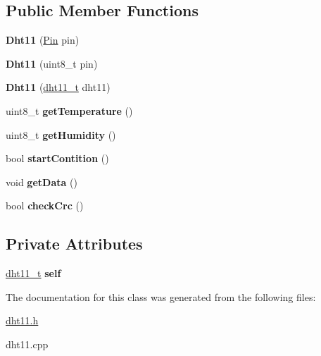 \subsection*{Public Member Functions}
\begin{DoxyCompactItemize}
\item 
\mbox{\label{classDht11_a2d28c64f9f68880b48c787fe8be65e82}} 
{\bfseries Dht11} (\hyperlink{classPin}{Pin} pin)
\item 
\mbox{\label{classDht11_aca67610ae8e6e7a2f1df449295944b12}} 
{\bfseries Dht11} (uint8\+\_\+t pin)
\item 
\mbox{\label{classDht11_af3721521ff45bfbbe0a6b2ff3801d511}} 
{\bfseries Dht11} (\hyperlink{structdht11__t}{dht11\+\_\+t} dht11)
\item 
\mbox{\label{classDht11_a0959ad424980bf0386e132b66cbade5c}} 
uint8\+\_\+t {\bfseries get\+Temperature} ()
\item 
\mbox{\label{classDht11_a7edaa36ffa969932f7522a92d4ebbc21}} 
uint8\+\_\+t {\bfseries get\+Humidity} ()
\item 
\mbox{\label{classDht11_a2e70616b1c70d2dc6937e38c6cef27de}} 
bool {\bfseries start\+Contition} ()
\item 
\mbox{\label{classDht11_ad4cb519c841e97b5d1464e1fb66b332f}} 
void {\bfseries get\+Data} ()
\item 
\mbox{\label{classDht11_aded72886f2b8eed116d027ac47227046}} 
bool {\bfseries check\+Crc} ()
\end{DoxyCompactItemize}
\subsection*{Private Attributes}
\begin{DoxyCompactItemize}
\item 
\mbox{\label{classDht11_ad12915cbf961e219ef06dc617389ca51}} 
\hyperlink{structdht11__t}{dht11\+\_\+t} {\bfseries self}
\end{DoxyCompactItemize}


The documentation for this class was generated from the following files\+:\begin{DoxyCompactItemize}
\item 
\hyperlink{dht11_8h}{dht11.\+h}\item 
dht11.\+cpp\end{DoxyCompactItemize}
